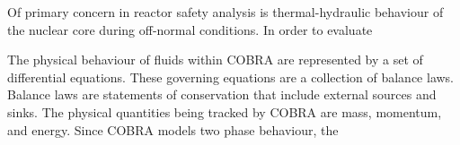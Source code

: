 
Of primary concern in reactor safety analysis is thermal-hydraulic behaviour of the nuclear core during off-normal conditions. In order to evaluate 

The physical behaviour of fluids within COBRA are represented by a set of differential equations.
These governing equations are a collection of balance laws.
Balance laws are statements of conservation that include external sources and sinks.
The physical quantities being tracked by COBRA are mass, momentum, and energy.
Since COBRA models two phase behaviour, the


